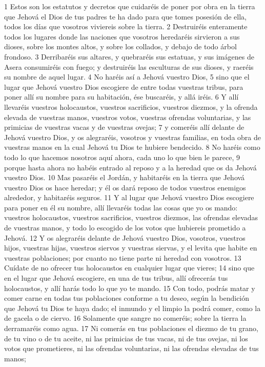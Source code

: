 1 Estos son los estatutos y decretos que cuidaréis de poner por obra en la tierra que Jehová el Dios de tus padres te ha dado para que tomes posesión de ella, todos los días que vosotros viviereis sobre la tierra.
2 Destruiréis enteramente todos los lugares donde las naciones que vosotros heredaréis sirvieron a sus dioses, sobre los montes altos, y sobre los collados, y debajo de todo árbol frondoso.
3 Derribaréis sus altares, y quebraréis sus estatuas, y sus imágenes de Asera consumiréis con fuego; y destruiréis las esculturas de sus dioses, y raeréis su nombre de aquel lugar.
4 No haréis así a Jehová vuestro Dios,
5 sino que el lugar que Jehová vuestro Dios escogiere de entre todas vuestras tribus, para poner allí su nombre para su habitación, ése buscaréis, y allá iréis.
6 Y allí llevaréis vuestros holocaustos, vuestros sacrificios, vuestros diezmos, y la ofrenda elevada de vuestras manos, vuestros votos, vuestras ofrendas voluntarias, y las primicias de vuestras vacas y de vuestras ovejas;
7 y comeréis allí delante de Jehová vuestro Dios, y os alegraréis, vosotros y vuestras familias, en toda obra de vuestras manos en la cual Jehová tu Dios te hubiere bendecido.
8 No haréis como todo lo que hacemos nosotros aquí ahora, cada uno lo que bien le parece,
9 porque hasta ahora no habéis entrado al reposo y a la heredad que os da Jehová vuestro Dios.
10 Mas pasaréis el Jordán, y habitaréis en la tierra que Jehová vuestro Dios os hace heredar; y él os dará reposo de todos vuestros enemigos alrededor, y habitaréis seguros.
11 Y al lugar que Jehová vuestro Dios escogiere para poner en él su nombre, allí llevaréis todas las cosas que yo os mando: vuestros holocaustos, vuestros sacrificios, vuestros diezmos, las ofrendas elevadas de vuestras manos, y todo lo escogido de los votos que hubiereis prometido a Jehová.
12 Y os alegraréis delante de Jehová vuestro Dios, vosotros, vuestros hijos, vuestras hijas, vuestros siervos y vuestras siervas, y el levita que habite en vuestras poblaciones; por cuanto no tiene parte ni heredad con vosotros.
13 Cuídate de no ofrecer tus holocaustos en cualquier lugar que vieres;
14 sino que en el lugar que Jehová escogiere, en una de tus tribus, allí ofrecerás tus holocaustos, y allí harás todo lo que yo te mando.
15 Con todo, podrás matar y comer carne en todas tus poblaciones conforme a tu deseo, según la bendición que Jehová tu Dios te haya dado; el inmundo y el limpio la podrá comer, como la de gacela o de ciervo.
16 Solamente que sangre no comeréis; sobre la tierra la derramaréis como agua.
17 Ni comerás en tus poblaciones el diezmo de tu grano, de tu vino o de tu aceite, ni las primicias de tus vacas, ni de tus ovejas, ni los votos que prometieres, ni las ofrendas voluntarias, ni las ofrendas elevadas de tus manos;
